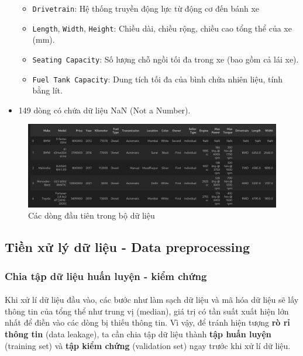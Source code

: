 \begin{itemize}
\begin{itemize}
        \item \texttt{Drivetrain}: Hệ thống truyền động lực từ động cơ đến bánh xe 
        \item \texttt{Length}, \texttt{Width}, \texttt{Height}: Chiều dài, chiều rộng, chiều cao tổng thể của xe (mm).
        \item \texttt{Seating Capacity}: Số lượng chỗ ngồi tối đa trong xe (bao gồm cả lái xe).
        \item \texttt{Fuel Tank Capacity}: Dung tích tối đa của bình chứa nhiên liệu, tính bằng lít.
    \end{itemize}
    \item 149 dòng có chứa dữ liệu NaN (Not a Number).
\end{itemize}

\begin{figure}[H]
    \centering
    \includegraphics[width=1\linewidth]{img/data-head.png}
    \caption{Các dòng đầu tiên trong bộ dữ liệu}
    \label{fig:data-head}
\end{figure}

\subsection{Tiền xử lý dữ liệu - Data preprocessing}

\subsubsection{Chia tập dữ liệu huấn luyện - kiểm chứng}

\paragraph{}{Khi xử lí dữ liệu đầu vào, các bước như làm sạch dữ liệu và mã hóa dữ liệu sẽ lấy thông tin của tổng thể như trung vị (median), giá trị có tần suất xuất hiện lớn nhất để điền vào các dòng bị thiếu thông tin. Vì vậy, để tránh hiện tượng \textbf{rò rỉ thông tin} (data leakage), ta cần chia tập dữ liệu thành \textbf{tập huấn luyện} (training set) và \textbf{tập kiểm chứng} (validation set) ngay trước khi xử lí dữ liệu.}

